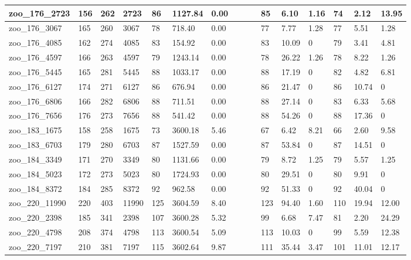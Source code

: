 \begin{landscape}
\begin{longtable}{llllllllllllllll}
zoo\_176\_2723 & 156 & 262 & 2723 & 86 & 1127.84 & 0.00 &  &  &  & 85 & 6.10 & 1.16 & 74 & 2.12 & 13.95 \\ \hline 
zoo\_176\_3067 & 165 & 260 & 3067 & 78 & 718.40 & 0.00 &  &  &  & 77 & 7.77 & 1.28 & 77 & 5.51 & 1.28 \\ \hline 
zoo\_176\_4085 & 162 & 274 & 4085 & 83 & 154.92 & 0.00 &  &  &  & 83 & 10.09 & 0 & 79 & 3.41 & 4.81 \\ \hline 
zoo\_176\_4597 & 166 & 263 & 4597 & 79 & 1243.14 & 0.00 &  &  &  & 78 & 26.22 & 1.26 & 78 & 8.22 & 1.26 \\ \hline 
zoo\_176\_5445 & 165 & 281 & 5445 & 88 & 1033.17 & 0.00 &  &  &  & 88 & 17.19 & 0 & 82 & 4.82 & 6.81 \\ \hline 
zoo\_176\_6127 & 174 & 271 & 6127 & 86 & 676.94 & 0.00 &  &  &  & 86 & 21.47 & 0 & 86 & 10.74 & 0 \\ \hline 
zoo\_176\_6806 & 166 & 282 & 6806 & 88 & 711.51 & 0.00 &  &  &  & 88 & 27.14 & 0 & 83 & 6.33 & 5.68 \\ \hline 
zoo\_176\_7656 & 176 & 273 & 7656 & 88 & 541.42 & 0.00 &  &  &  & 88 & 54.26 & 0 & 88 & 17.36 & 0 \\ \hline 
zoo\_183\_1675 & 158 & 258 & 1675 & 73 & 3600.18 & 5.46 &  &  &  & 67 & 6.42 & 8.21 & 66 & 2.60 & 9.58 \\ \hline 
zoo\_183\_6703 & 179 & 280 & 6703 & 87 & 1527.59 & 0.00 &  &  &  & 87 & 53.84 & 0 & 87 & 14.51 & 0 \\ \hline 
zoo\_184\_3349 & 171 & 270 & 3349 & 80 & 1131.66 & 0.00 &  &  &  & 79 & 8.72 & 1.25 & 79 & 5.57 & 1.25 \\ \hline 
zoo\_184\_5023 & 172 & 273 & 5023 & 80 & 1724.93 & 0.00 &  &  &  & 80 & 29.51 & 0 & 80 & 9.91 & 0 \\ \hline 
zoo\_184\_8372 & 184 & 285 & 8372 & 92 & 962.58 & 0.00 &  &  &  & 92 & 51.33 & 0 & 92 & 40.04 & 0 \\ \hline 
zoo\_220\_11990 & 220 & 403 & 11990 & 125 & 3604.59 & 8.40 &  &  &  & 123 & 94.40 & 1.60 & 110 & 19.94 & 12.00 \\ \hline 
zoo\_220\_2398 & 185 & 341 & 2398 & 107 & 3600.28 & 5.32 &  &  &  & 99 & 6.68 & 7.47 & 81 & 2.20 & 24.29 \\ \hline 
zoo\_220\_4798 & 208 & 374 & 4798 & 113 & 3600.54 & 5.09 &  &  &  & 113 & 10.03 & 0 & 99 & 5.59 & 12.38 \\ \hline 
zoo\_220\_7197 & 210 & 381 & 7197 & 115 & 3602.64 & 9.87 &  &  &  & 111 & 35.44 & 3.47 & 101 & 11.01 & 12.17 \\ \hline 

\end{longtable}
\end{landscape}
